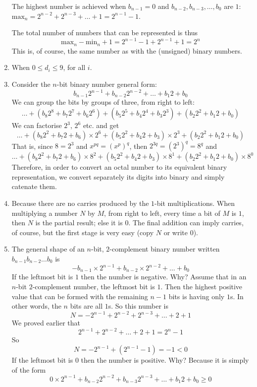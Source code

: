 \begin{enumerate}
    The highest number is achieved when \(b_{n-1}=0\) and \(b_{n-2},
    b_{n-3}, \dots, b_0\) are \(1\): \(\text{max}_n = 2^{n-2} +
    2^{n-3} + \dots + 1 = 2^{n-1} - 1\).

    The total number of numbers that can be represented is thus
    \[
     \text{max}_n - \text{min}_n + 1 = 2^{n-1} - 1 + 2^{n-1} + 1 = 2^{n}
    \]
    This is, of course, the same number as with the (unsigned) binary
    numbers.

  \item When \(0 \leqslant d_i \leqslant 9\), for all \(i\).

  \item Consider the \(n\)-bit binary number general form:
    \[
     b_{n-1} 2^{n-1} + b_{n-2} 2^{n-2} + \dots + b_1 2 + b_0
    \]
    We can group the bits by groups of three, from right to left:
    \[
     \dots + (b_8 2^8 + b_7 2^7 + b_6 2^6) + (b_5 2^5 + b_4 2^4 + b_3 2^3)
     + (b_2 2^2 + b_1 2 + b_0) 
    \]
    We can factorise \(2^3\), \(2^6\) etc. and get
    \[
     \dots + (b_8 2^2 + b_7 2 + b_6) \times 2^6 + (b_5 2^2 + b_4 2 + b_3)
     \times 2^3 + (b_2 2^2 + b_1 2 + b_0)
    \]
    That is, since \(8 = 2^3\) and \(x^{pq} = (x^p)^q\), then \(2^{3q}
    = (2^3)^q = 8^q\) and
    \[
     \dots + (b_8 2^2 + b_7 2 + b_6) \times 8^2 + (b_5 2^2 + b_4 2 + b_3)
     \times 8^1 + (b_2 2^2 + b_1 2 + b_0) \times 8^0
    \]
    Therefore, in order to convert an octal number to its equivalent
    binary representation, we convert separately its digits into
    binary and simply catenate them.

  \item Because there are no carries produced by the \(1\)-bit
    multiplications. When multiplying a number \(N\) by \(M\), from
    right to left, every time a bit of \(M\) is \(1\), then \(N\) is
    the partial result; else it is \(0\). The final addition can imply
    carries, of course, but the first stage is very easy (copy \(N\)
    or write \(0\)).

  \item The general shape of an \(n\)-bit, \(2\)-complement binary
    number written \( b_{n-1}b_{n-2}\dots{b_0}\) is
    \[
     -b_{n-1} \times 2^{n-1} + b_{n-2} \times 2^{n-2} + \dots + b_0
    \]
    If the leftmost bit is \(1\) then the number is negative. Why?
    Assume that in an \(n\)-bit \(2\)-complement number, the leftmost
    bit is \(1\). Then the highest positive value that can be formed
    with the remaining \(n-1\) bits is having only \(1\)s. In other
    words, the \(n\) bits are all \(1\)s. So this number is
    \[
     N = -2^{n-1} + 2^{n-2} + 2^{n-3} + \dots + 2 + 1
    \]
    We proved earlier that
    \[
    2^{n-1} + 2^{n-2} + \dots + 2 + 1 = 2^n - 1
    \]
    So
    \[
    N = -2^{n-1} + (2^{n-1} - 1) = -1 < 0
    \]
    If the leftmost bit is \(0\) then the number is positive. Why?
    Because it is simply of the form
    \[
    0 \times 2^{n-1} + b_{n-2} 2^{n-2} + b_{n-3} 2^{n-3} + \dots + b_1 2 +
    b_0 \geqslant 0
    \]


\end{enumerate}
